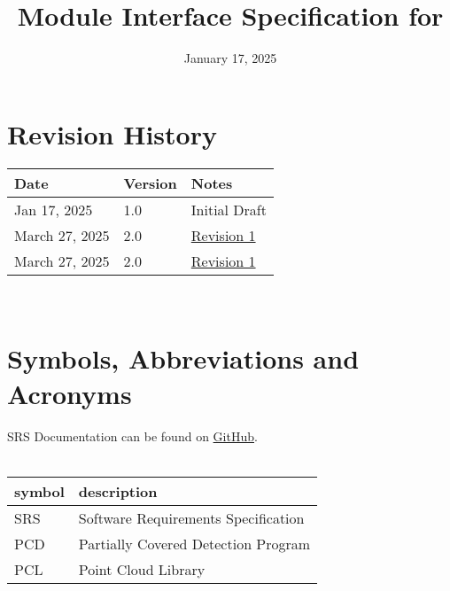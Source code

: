 \documentclass[12pt, titlepage]{article}
\begin{document}
\title{Module Interface Specification for \progname{}}

\author{\authname}

\date{January 17, 2025}

\maketitle


\section{Revision History}

\begin{tabularx}{\textwidth}{p{3cm}p{2cm}X}
\toprule {\bf Date} & {\bf Version} & {\bf Notes}\\
\midrule
Jan 17, 2025 & 1.0 & Initial Draft\\
March 27, 2025 & 2.0 & \href{https://github.com/takhtart/PCD/issues/106}{Revision 1}\\
March 27, 2025 & 2.0 & \href{https://github.com/takhtart/PCD/issues/107}{Revision 1}\\
\bottomrule
\end{tabularx}

~\newpage

\section{Symbols, Abbreviations and Acronyms}

SRS Documentation can be found on \href{https://github.com/takhtart/PCD/blob/main/docs/SRS/SRS.pdf}{GitHub}.\\
\\
\renewcommand{\arraystretch}{1.2}
\begin{tabular}{l l} 
  \toprule		
  \textbf{symbol} & \textbf{description}\\
  \midrule 
  SRS & Software Requirements Specification\\
  PCD & Partially Covered Detection Program \\
  PCL & Point Cloud Library \\
  \bottomrule
\end{tabular}\\

\newpage

\tableofcontents

\newpage

\end{document}
